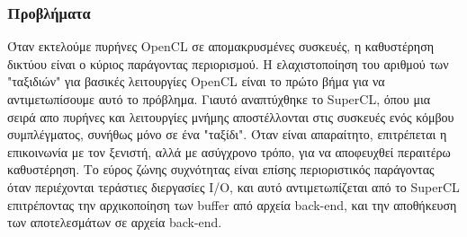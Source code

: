\subsubsection{Προβλήματα}
Όταν εκτελούμε πυρήνες OpenCL σε απομακρυσμένες συσκευές, η καθυστέρηση δικτύου είναι ο κύριος παράγοντας περιορισμού. Η ελαχιστοποίηση του αριθμού των "ταξιδιών" για βασικές λειτουργίες OpenCL είναι το πρώτο βήμα για να αντιμετωπίσουμε αυτό το πρόβλημα. Γιαυτό αναπτύχθηκε το SuperCL, όπου μια σειρά απο πυρήνες και λειτουργίες μνήμης αποστέλλονται στις συσκευές ενός κόμβου συμπλέγματος, συνήθως μόνο σε ένα "ταξίδι". Όταν είναι απαραίτητο, επιτρέπεται η επικοινωνία με τον ξενιστή, αλλά με ασύγχρονο τρόπο, για να αποφευχθεί περαιτέρω καθυστέρηση. Το εύρος ζώνης συχνότητας είναι επίσης περιοριστικός παράγοντας όταν περιέχονται τεράστιες διεργασίες I/O, και αυτό αντιμετωπίζεται από το SuperCL επιτρέποντας την αρχικοποίηση των buffer από αρχεία back-end, και την αποθήκευση των αποτελεσμάτων σε αρχεία back-end.\cite{virtualcl-5}

\